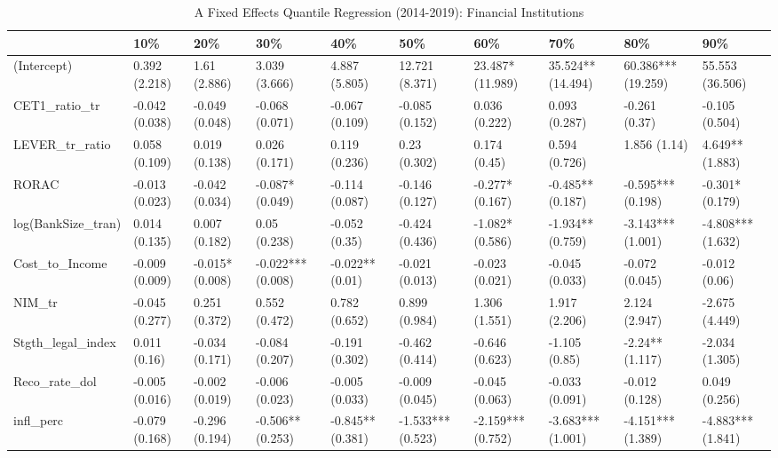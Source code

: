 \begin{table}[ht]
\centering
\caption{A Fixed Effects Quantile Regression (2014-2019): Financial Institutions} 
\begingroup\small
\begin{tabular}{llllllllll}
  \toprule
 & 10\% & 20\% & 30\% & 40\% & 50\% & 60\% & 70\% & 80\% & 90\% \\ 
  \midrule
(Intercept) & 0.392 (2.218) & 1.61 (2.886) & 3.039 (3.666) & 4.887 (5.805) & 12.721 (8.371) & 23.487* (11.989) & 35.524** (14.494) & 60.386*** (19.259) & 55.553 (36.506) \\ 
  CET1\_ratio\_tr & -0.042 (0.038) & -0.049 (0.048) & -0.068 (0.071) & -0.067 (0.109) & -0.085 (0.152) & 0.036 (0.222) & 0.093 (0.287) & -0.261 (0.37) & -0.105 (0.504) \\ 
  LEVER\_tr\_ratio & 0.058 (0.109) & 0.019 (0.138) & 0.026 (0.171) & 0.119 (0.236) & 0.23 (0.302) & 0.174 (0.45) & 0.594 (0.726) & 1.856 (1.14) & 4.649** (1.883) \\ 
  RORAC & -0.013 (0.023) & -0.042 (0.034) & -0.087* (0.049) & -0.114 (0.087) & -0.146 (0.127) & -0.277* (0.167) & -0.485** (0.187) & -0.595*** (0.198) & -0.301* (0.179) \\ 
  log(BankSize\_tran) & 0.014 (0.135) & 0.007 (0.182) & 0.05 (0.238) & -0.052 (0.35) & -0.424 (0.436) & -1.082* (0.586) & -1.934** (0.759) & -3.143*** (1.001) & -4.808*** (1.632) \\ 
  Cost\_to\_Income & -0.009 (0.009) & -0.015* (0.008) & -0.022*** (0.008) & -0.022** (0.01) & -0.021 (0.013) & -0.023 (0.021) & -0.045 (0.033) & -0.072 (0.045) & -0.012 (0.06) \\ 
  NIM\_tr & -0.045 (0.277) & 0.251 (0.372) & 0.552 (0.472) & 0.782 (0.652) & 0.899 (0.984) & 1.306 (1.551) & 1.917 (2.206) & 2.124 (2.947) & -2.675 (4.449) \\ 
  Stgth\_legal\_index & 0.011 (0.16) & -0.034 (0.171) & -0.084 (0.207) & -0.191 (0.302) & -0.462 (0.414) & -0.646 (0.623) & -1.105 (0.85) & -2.24** (1.117) & -2.034 (1.305) \\ 
  Reco\_rate\_dol & -0.005 (0.016) & -0.002 (0.019) & -0.006 (0.023) & -0.005 (0.033) & -0.009 (0.045) & -0.045 (0.063) & -0.033 (0.091) & -0.012 (0.128) & 0.049 (0.256) \\ 
  infl\_perc & -0.079 (0.168) & -0.296 (0.194) & -0.506** (0.253) & -0.845** (0.381) & -1.533*** (0.523) & -2.159*** (0.752) & -3.683*** (1.001) & -4.151*** (1.389) & -4.883*** (1.841) \\ 

\end{tabular}
\end{table}
